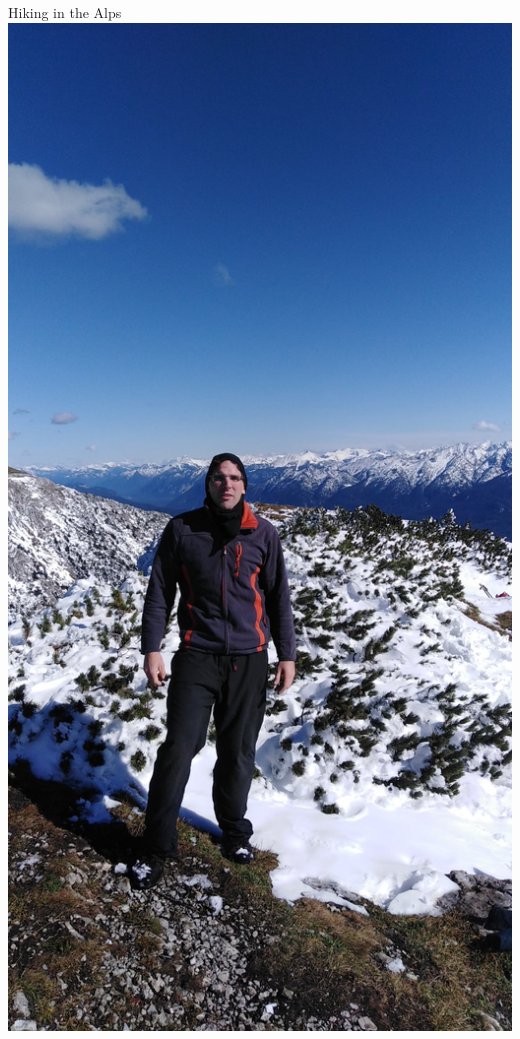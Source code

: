 \documentclass[fleqn]{beamer}
\begin{document}
\begin{frame}{Hiking in the Alps}
  \includegraphics[height=\textheight]{hiking.jpg}


\end{frame}
\end{document}
